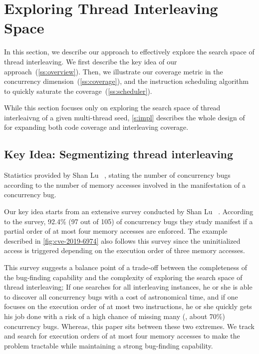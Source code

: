 \section{Exploring Thread Interleaving Space}
\label{s:design}


In this section, we describe our approach to effectively explore the
search space of thread interleaving.
%
We first describe the key idea of our
approach~(\autoref{ss:overview}). Then, we illustrate our coverage
metric in the concurrency dimension~(\autoref{ss:coverage}), and the
instruction scheduling algorithm to quickly saturate the
coverage~(\autoref{ss:scheduler}).


%
While this section focuses only on exploring the search space of
thread interleaivng of a given multi-thread seed, \autoref{s:impl}
describes the whole design of \sys for expanding both code coverage
and interleaving coverage.


\subsection{Key Idea: Segmentizing thread interleaving}
\label{ss:overview}


\begin{table}[t]
  \centering
  
  \caption{Statistics provided by Shan Lu
    \etal~\cite{learningfrommistakes}, stating the number of
    concurrency bugs according to the number of memory accesses
    involved in the manifestation of a concurrency bug.}
  \label{table:learningfrommistakes}
\end{table}

Our key idea starts from an extensive survey conducted by Shan Lu
\etal~\cite{learningfrommistakes}.
%
According to the survey, 92.4\% (97 out of 105) of concurrency bugs
they study manifest if a partial order of at most four memory accesses
are enforced.
%
The example described in \autoref{fig:cve-2019-6974} also follows this
survey since the uninitialized access is triggered depending on the
execution order of three memory accesses.


This survey suggests a balance point of a trade-off between the
completeness of the bug-finding capability and the complexity of
exploring the search space of thread interleaving;
%
If one searches for all interleaving instances, he or she is able to
discover all concurrency bugs with a cost of astronomical time, and
if one focuses on the execution order of at most two instructions, he
or she quickly gets his job done with a risk of a high chance of
missing many (\eg, about 70\%) concurrency bugs.
%
Whereas, this paper sits between these two extremes. We track and
search for execution orders of at most four memory accesses to make
the problem tractable while maintaining a strong bug-finding
capability.



